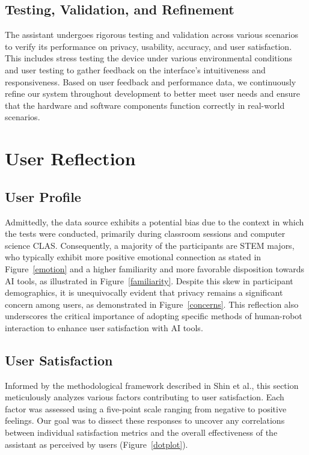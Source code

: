 \documentclass[12pt]{article}
\begin{document}
\subsection{Testing, Validation, and Refinement}
The assistant undergoes rigorous testing and validation across various scenarios to verify its performance on privacy, usability, accuracy, and user satisfaction. This includes stress testing the device under various environmental conditions and user testing to gather feedback on the interface's intuitiveness and responsiveness. Based on user feedback and performance data, we continuously refine our system throughout development to better meet user needs and ensure that the hardware and software components function correctly in real-world scenarios. 


\section{User Reflection}
\subsection{User Profile}
Admittedly, the data source exhibits a potential bias due to the context in which the tests were conducted, primarily during classroom sessions and computer science CLAS. Consequently, a majority of the participants are STEM majors, who typically exhibit more positive emotional connection as stated in Figure~\ref{emotion} and a higher familiarity and more favorable disposition towards AI tools, as illustrated in Figure~\ref{familiarity}. Despite this skew in participant demographics, it is unequivocally evident that privacy remains a significant concern among users, as demonstrated in Figure~\ref{concerns}. This reflection also underscores the critical importance of adopting specific methods of human-robot interaction to enhance user satisfaction with AI tools.

\subsection{User Satisfaction}
Informed by the methodological framework described in Shin et al.\cite{shin2021emotional}, this section meticulously analyzes various factors contributing to user satisfaction. Each factor was assessed using a five-point scale ranging from negative to positive feelings. Our goal was to dissect these responses to uncover any correlations between individual satisfaction metrics and the overall effectiveness of the assistant as perceived by users (Figure~\ref{dotplot}).
\end{document}
